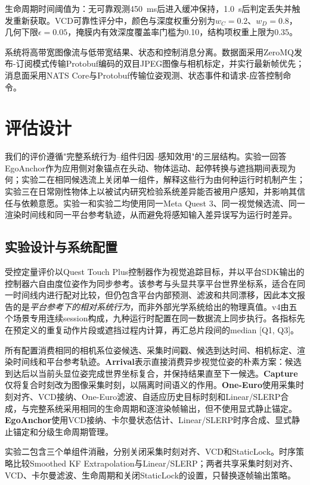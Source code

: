 \documentclass[review]{vgtc}
\begin{document}
生命周期时间阈值为：无可靠观测450~ms后进入缓冲保持，1.0~s后判定丢失并触发重新获取。VCD可靠性评分中，颜色与深度权重分别为$w_C = 0.2$、$w_D = 0.8$，几何下限$\epsilon = 0.05$，掩膜内有效深度覆盖率门槛为0.10，结构项权重上限为0.35。

系统将高带宽图像流与低带宽结果、状态和控制消息分离。数据面采用ZeroMQ发布-订阅模式传输Protobuf编码的双目JPEG图像与相机标定，并实行最新帧优先；消息面采用NATS Core与Protobuf传输位姿观测、状态事件和请求-应答控制命令。

\section{评估设计}\label{sec:evaluation}

我们的评价遵循"完整系统行为--组件归因--感知效用"的三层结构。实验一回答EgoAnchor作为应用侧对象锚点在头动、物体运动、起停转换与遮挡期间表现为何；实验二在相同候选流上关闭单一组件，解释这些行为由何种运行时机制产生；实验三在日常刚性物体上以被试内研究检验系统差异能否被用户感知，并影响其信任与依赖意愿。实验一和实验二均使用同一Meta Quest 3、同一视觉候选流、同一渲染时间线和同一平台参考轨迹，从而避免将感知输入差异误写为运行时差异。

\subsection{实验设计与系统配置}

受控定量评价以Quest Touch Plus控制器作为视觉追踪目标，并以平台SDK输出的控制器六自由度位姿作为同步参考。该参考与头显共享平台世界坐标系，适合在同一时间线内进行配对比较，但仍包含平台内部预测、滤波和共同漂移，因此本文报告的是\emph{平台参考下的相对系统行为}，而非外部光学系统给出的物理真值。v4由五个场景专用连续session构成，九种运行时配置在同一数据流上同步执行。各指标先在预定义的重复动作片段或遮挡过程内计算，再汇总片段间的median [Q1, Q3]。

所有配置消费相同的相机系位姿候选、采集时间戳、候选到达时间、相机标定、渲染时间线和平台参考轨迹。\textbf{Arrival}表示直接消费异步视觉位姿的朴素方案：候选到达后以当前头显位姿完成世界坐标复合，并保持结果直至下一候选。\textbf{Capture}仅将复合时刻改为图像采集时刻，以隔离时间语义的作用。\textbf{One-Euro}使用采集时刻对齐、VCD接纳、One-Euro滤波、自适应历史目标时刻和Linear/SLERP合成，与完整系统采用相同的生命周期和逐渲染帧输出，但不使用显式静止锚定。\textbf{EgoAnchor}使用VCD接纳、卡尔曼状态估计、Linear/SLERP时序合成、显式静止锚定和分级生命周期管理。

实验二包含三个单组件消融，分别关闭采集时刻对齐、VCD和StaticLock。时序策略比较Smoothed KF Extrapolation与Linear/SLERP；两者共享采集时刻对齐、VCD、卡尔曼滤波、生命周期和关闭StaticLock的设置，只替换逐帧输出策略。
\end{document}
